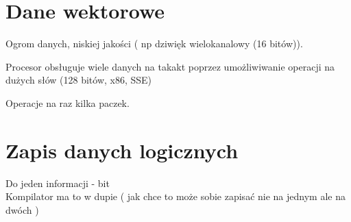 \documentclass{article}
\begin{document}
\newpage
\section{Dane wektorowe}
Ogrom danych, niskiej jakości ( np dziwięk wielokanalowy (16 bitów)).

Procesor obsługuje wiele danych na takakt poprzez umożliwiwanie operacji na dużych słów (128 bitów, x86, SSE)

Operacje na raz kilka paczek.
\section{Zapis danych logicznych}
Do jeden informacji - bit \\
Kompilator ma to w dupie ( jak chce to może sobie zapisać nie na jednym ale na dwóch )
\end{document}
